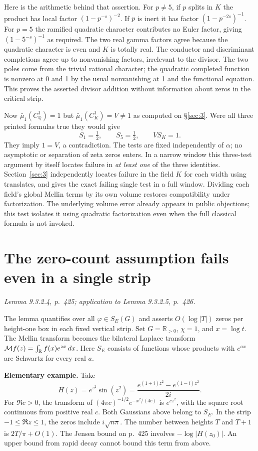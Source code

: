 \documentclass[11pt,reqno]{amsart}
\numberwithin{equation}{section}
\newcommand{\Q}{\mathbb Q}\newcommand{\R}{\mathbb R}\newcommand{\C}{\mathbb C}\newcommand{\Z}{\mathbb Z}
\begin{document}
Here is the arithmetic behind that assertion. For \(p\ne5\), if \(p\) splits in \(K\) the product has local factor \((1-p^{-s})^{-2}\). If \(p\) is inert it has factor \((1-p^{-2s})^{-1}\). For \(p=5\) the ramified quadratic character contributes no Euler factor, giving \((1-5^{-s})^{-1}\) as required. The two real gamma factors agree because the quadratic character is even and \(K\) is totally real. The conductor and discriminant completions agree up to nonvanishing factors, irrelevant to the divisor. The two poles come from the trivial rational character; the quadratic completed function is nonzero at 0 and 1 by the usual nonvanishing at 1 and the functional equation. This proves the asserted divisor addition without information about zeros in the critical strip.

Now \(\bar\mu_1(C_\Q^1)=1\) but \(\bar\mu_1(C_K^1)=V\ne1\) as computed on \S\ref{sec:3}. Were all three printed formulas true they would give
\[
       S_1=\tfrac12,\qquad S_5=\tfrac12,\qquad V S_K=1 .
\]
They imply \(1=V\), a contradiction. The tests are fixed independently of \(\alpha\); no asymptotic or separation of zeta zeros enters. In a narrow window this three-test argument by itself locates failure in \emph{at least one} of the three identities. Section~\ref{sec:3} independently locates failure in the field \(K\) for each width using translates, and gives the exact failing single test in a full window. Dividing each field's global Mellin terms by its own volume restores compatibility under factorization. The underlying volume error already appears in public objections; this test isolates it using quadratic factorization even when the full classical formula is not invoked.


\section{The zero-count assumption fails even in a single strip}\label{sec:5}

\textit{Lemma 9.3.2.4, p.~425; application to Lemma 9.3.2.5, p.~426.}\par
The lemma quantifies over all \(\varphi\in S_E(G)\) and asserts \(O(\log |T|)\) zeros per height-one box in each fixed vertical strip. Set \(G=\R_{>0}\), \(\chi=1\), and \(x=\log t\). The Mellin transform becomes the bilateral Laplace transform \(\M f(z)=\int_\R f(x)e^{zx}\,dx\). Here \(S_E\) consists of functions whose products with \(e^{a x}\) are Schwartz for every real \(a\).

\textbf{Elementary example.} Take
\[
 H(z)=e^{z^2}\sin(z^2)=\frac{e^{(1+i)z^2}-e^{(1-i)z^2}}{2i}.
\]
For \(\Re c>0\), the transform of \((4\pi c)^{-1/2}e^{-x^2/(4c)}\) is \(e^{cz^2}\), with the square root continuous from positive real \(c\). Both Gaussians above belong to \(S_E\). In the strip \(-1\le\Re z\le1\), the zeros include \(i\sqrt{n\pi}\). The number between heights \(T\) and \(T+1\) is \(2T/\pi+O(1)\). The Jensen bound on p.~425 involves \(-\log|H(z_0)|\). An upper bound from rapid decay cannot bound this term from above.
\end{document}
